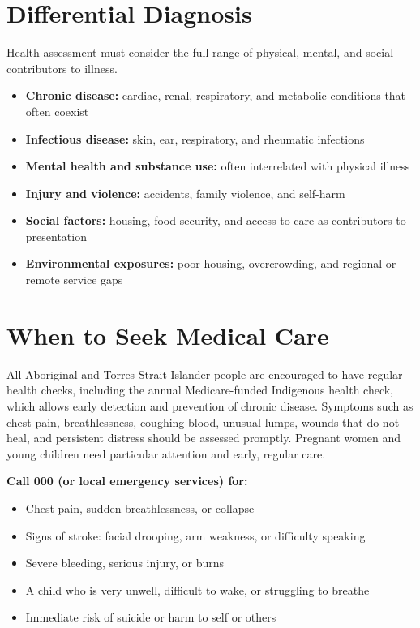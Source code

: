 \section*{Differential Diagnosis}
Health assessment must consider the full range of physical, mental, and social contributors to illness.
\begin{itemize}
    \item \textbf{Chronic disease:} cardiac, renal, respiratory, and metabolic conditions that often coexist
    \item \textbf{Infectious disease:} skin, ear, respiratory, and rheumatic infections
    \item \textbf{Mental health and substance use:} often interrelated with physical illness
    \item \textbf{Injury and violence:} accidents, family violence, and self-harm
    \item \textbf{Social factors:} housing, food security, and access to care as contributors to presentation
    \item \textbf{Environmental exposures:} poor housing, overcrowding, and regional or remote service gaps
\end{itemize}

\section*{When to Seek Medical Care}
All Aboriginal and Torres Strait Islander people are encouraged to have regular health checks, including the annual Medicare-funded Indigenous health check, which allows early detection and prevention of chronic disease. Symptoms such as chest pain, breathlessness, coughing blood, unusual lumps, wounds that do not heal, and persistent distress should be assessed promptly. Pregnant women and young children need particular attention and early, regular care.

\textbf{Call 000 (or local emergency services) for:}
\begin{itemize}
    \item Chest pain, sudden breathlessness, or collapse
    \item Signs of stroke: facial drooping, arm weakness, or difficulty speaking
    \item Severe bleeding, serious injury, or burns
    \item A child who is very unwell, difficult to wake, or struggling to breathe
    \item Immediate risk of suicide or harm to self or others
\end{itemize}

